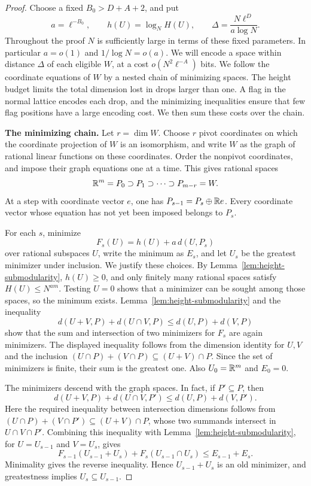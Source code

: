 \begin{proof}
Choose a fixed \(B_0>D+A+2\), and put
\[
 a=\ell^{-B_0},\qquad h(U)=\log_N H(U),\qquad
 \Delta=\frac{N\ell^D}{a\log N}.
\]
Throughout the proof \(N\) is sufficiently large in terms of these
fixed parameters. In particular \(a=o(1)\) and \(1/\log N=o(a)\).
We will encode a space within distance \(\Delta\) of each eligible
\(W\), at a cost \(o(N^2\ell^{-A})\) bits.
We follow the coordinate equations of \(W\) by a nested chain of
minimizing spaces. The height budget limits the total dimension lost in
drops larger than one. A flag in the normal lattice encodes each drop,
and the minimizing inequalities ensure that few flag positions have a
large encoding cost. We then sum these costs over the chain.

\medskip\noindent\textbf{The minimizing chain.}
Let \(r=\dim W\). Choose \(r\) pivot coordinates on which the coordinate
projection of \(W\) is an isomorphism, and write \(W\) as the graph of
rational linear functions on these coordinates. Order the nonpivot
coordinates, and impose their graph equations one at a time. This gives
rational spaces
\[
 \mathbb R^m=P_0\supset P_1\supset\cdots\supset P_{m-r}=W.
\]
At a step with coordinate vector \(e\), one has
\(P_{s-1}=P_s\oplus\mathbb R e\). Every coordinate vector whose equation has
not yet been imposed belongs to \(P_s\).

For each \(s\), minimize
\[
 F_s(U)=h(U)+a\,d(U,P_s)
\]
over rational subspaces \(U\), write the minimum as \(E_s\), and let
\(U_s\) be the greatest minimizer under inclusion. We justify these
choices. By Lemma~\ref{lem:height-submodularity}, \(h(U)\ge0\), and only
finitely many rational spaces satisfy \(H(U)\le N^{am}\). Testing
\(U=0\) shows that a minimizer can be sought among those spaces, so the
minimum exists.
Lemma~\ref{lem:height-submodularity} and the inequality
\[
 d(U+V,P)+d(U\cap V,P)\le d(U,P)+d(V,P)
\]
show that the sum and intersection of two minimizers for \(F_s\) are
again minimizers. The displayed inequality follows from the dimension
identity for \(U,V\) and the inclusion
\((U\cap P)+(V\cap P)\subseteq (U+V)\cap P\).
Since the set of minimizers is finite, their sum is the greatest one.
Also \(U_0=\mathbb R^m\) and \(E_0=0\).

The minimizers descend with the graph spaces. In fact, if \(P'\subseteq
P\), then
\[
 d(U+V,P)+d(U\cap V,P')\le d(U,P)+d(V,P').
\]
Here the required inequality between intersection dimensions follows
from
\((U\cap P)+(V\cap P')\subseteq (U+V)\cap P\), whose two summands
intersect in \(U\cap V\cap P'\). Combining this inequality with
Lemma~\ref{lem:height-submodularity}, for \(U=U_{s-1}\) and \(V=U_s\),
gives
\[
 F_{s-1}(U_{s-1}+U_s)+F_s(U_{s-1}\cap U_s)
 \le E_{s-1}+E_s.
\]
Minimality gives the reverse inequality. Hence \(U_{s-1}+U_s\) is an
old minimizer, and greatestness implies \(U_s\subseteq U_{s-1}\).


\end{proof}
